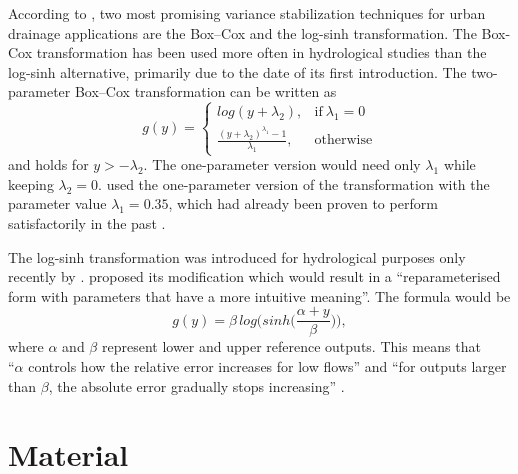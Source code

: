 \documentclass{ctuthesis}\usepackage[]{graphicx}\usepackage[]{color}
\begin{document}
According to \cite{giudice2013improving},  two most promising variance stabilization techniques for urban drainage
applications are the Box–Cox \citep{box1964analysis}  and the log-sinh \citep{wang2012log} transformation. The Box-Cox transformation has been used more often in hydrological studies  than the log-sinh alternative, primarily due to the date of its first introduction. The two-parameter Box–Cox transformation can be written as
\begin{equation}
 g(y)=
    \begin{cases}
      log(y+\lambda_2) , & \text{if}\ \lambda_1=0 \\
      \frac{(y+\lambda_2)^{\lambda_1}-1}{\lambda_1} , & \text{otherwise}
    \end{cases}
\end{equation}
and holds for $y > -\lambda_2$. The one-parameter version would need only  $\lambda_1$  while keeping $\lambda_2 = 0$. \cite{giudice2013improving} used the one-parameter version of the transformation with the parameter value $\lambda_1=0.35$, which had already been proven to perform satisfactorily in the past \citep[e.g.][]{honti2013integrated, wang2012log}.

The log-sinh transformation was introduced for hydrological purposes only recently by \cite{wang2012log}. \cite{giudice2013improving}  proposed its modification which would result in a \enquote{reparameterised form with parameters that have a more intuitive meaning}. The formula would be
\begin{equation}
g(y)= \beta \, log \Big(sinh \big( \frac{\alpha+y}{\beta} \big) \Big),
\end{equation}
where $\alpha$ and $\beta$ represent lower and upper reference outputs. This means that \\ \enquote{$\alpha$ controls how the relative error increases for low flows} and \enquote{for outputs larger than $\beta$, the absolute error gradually stops increasing} \citep{giudice2013improving}.






        


\chapter{Material} \label{chap3}
\end{document}
